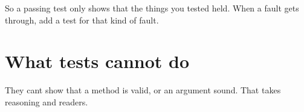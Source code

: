 So a passing test only shows that the things you tested held. When a fault gets through, add a test for that kind of fault.

\section{What tests cannot do}\label{what-tests-cannot-do}

They can\textquotesingle t show that a method is valid, or an argument sound. That takes reasoning and readers.

